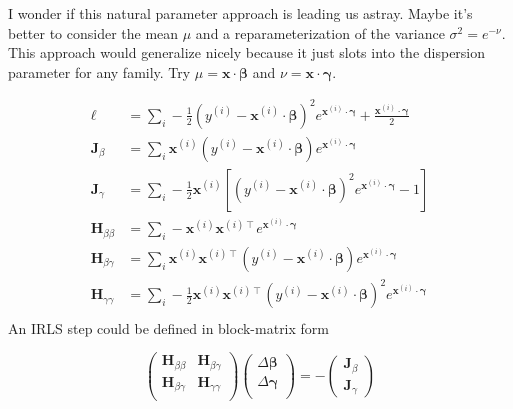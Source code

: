 \documentclass{article}
\begin{document}
I wonder if this natural parameter approach is leading us astray. Maybe it's
better to consider the mean \(\mu\) and a reparameterization of the variance
\(\sigma^2 = e^{-\nu}\). This approach would generalize nicely because it just
slots into the dispersion parameter for any family. Try \(\mu =
\mathbf{x}\cdot\boldsymbol\beta\) and \(\nu =
\mathbf{x}\cdot\boldsymbol\gamma\).

\begin{align}
  \ell &= \sum_i -\frac{1}{2} (y^{(i)} - \mathbf{x}^{(i)}\cdot\boldsymbol\beta)^2 e^{\mathbf{x}^{(i)}\cdot\boldsymbol\gamma} + \frac{\mathbf{x}^{(i)}\cdot\boldsymbol\gamma}{2} \\
  \mathbf{J}_\beta &= \sum_i \mathbf{x}^{(i)}(y^{(i)} - \mathbf{x}^{(i)}\cdot\boldsymbol\beta) e^{\mathbf{x}^{(i)}\cdot\boldsymbol\gamma} \\
  \mathbf{J}_\gamma &= \sum_i -\frac{1}{2}\mathbf{x}^{(i)}\left[ (y^{(i)} - \mathbf{x}^{(i)}\cdot\boldsymbol\beta)^2 e^{\mathbf{x}^{(i)}\cdot\boldsymbol\gamma} - 1 \right] \\
  \mathbf{H}_{\beta\beta} &= \sum_i -\mathbf{x}^{(i)}\mathbf{x}^{(i)\intercal} e^{\mathbf{x}^{(i)}\cdot\boldsymbol\gamma} \\
  \mathbf{H}_{\beta\gamma} &= \sum_i \mathbf{x}^{(i)}\mathbf{x}^{(i)\intercal}(y^{(i)} - \mathbf{x}^{(i)}\cdot\boldsymbol\beta) e^{\mathbf{x}^{(i)}\cdot\boldsymbol\gamma} \\
  \mathbf{H}_{\gamma\gamma} &= \sum_i -\frac{1}{2}\mathbf{x}^{(i)}\mathbf{x}^{(i)\intercal}  (y^{(i)} - \mathbf{x}^{(i)}\cdot\boldsymbol\beta)^2 e^{\mathbf{x}^{(i)}\cdot\boldsymbol\gamma} \\
\end{align}
An IRLS step could be defined in block-matrix form

\begin{equation}
  \begin{pmatrix} 
    \mathbf{H}_{\beta\beta} & \mathbf{H}_{\beta\gamma} \\ 
    \mathbf{H}_{\beta\gamma} & \mathbf{H}_{\gamma\gamma} \\ 
  \end{pmatrix} \begin{pmatrix}
  \Delta \boldsymbol\beta \\
  \Delta \boldsymbol\gamma \\
    \end{pmatrix} = - \begin{pmatrix}
  \mathbf{J}_\beta \\
  \mathbf{J}_\gamma
  \end{pmatrix}
\end{equation}
\end{document}
